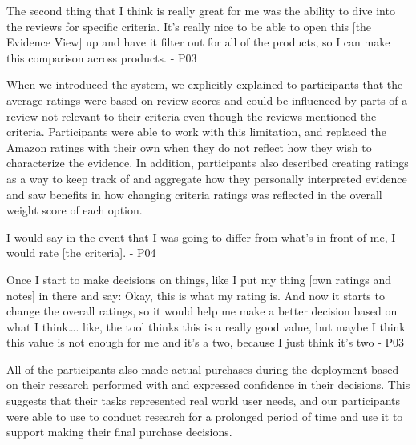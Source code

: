 \begin{tightquote}

The second thing that I think is really great for me was the ability to dive into the reviews for specific criteria. It's really nice to be able to open this [the Evidence View] up and have it filter out for all of the products, so I can make this comparison across products.  - P03

\end{tightquote}

When we introduced the system, we explicitly explained to participants that the average ratings were based on review scores and could be influenced by parts of a review not relevant to their criteria even though the reviews mentioned the criteria. Participants were able to work with this limitation, and replaced the Amazon ratings with their own when they do  not reflect how they wish to characterize the evidence. In addition, participants also described creating ratings as a way to keep track of and aggregate how they personally interpreted evidence and saw benefits in how changing criteria ratings was reflected in the overall weight score of each option.

\begin{tightquote}

I would say in the event that I was going to differ from what's in front of me, I would rate [the criteria]. - P04

\end{tightquote}

\begin{tightquote}

Once I start to make decisions on things, like I put my thing [own ratings and notes] in there and say: Okay, this is what my rating is. And now it starts to change the overall ratings, so it would help me make a better decision based on what I think…. like, the tool thinks this is a really good value, but maybe I think this value is not enough for me and it's a two, because I just think it's two - P03

\end{tightquote}

All of the participants also made actual purchases during the deployment based on their research performed with \SYSTEM and expressed confidence in their decisions. This suggests that their tasks represented real world user needs, and our participants were able to use \SYSTEM to conduct research for a prolonged period of time and use it to support making their final purchase decisions.



